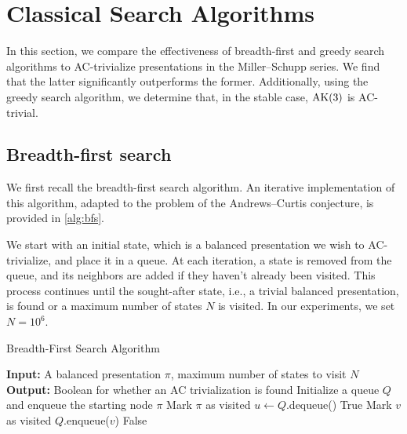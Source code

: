 
\section{Classical Search Algorithms}\label{sec:search}

In this section, we compare the effectiveness of breadth-first and greedy search algorithms to AC-trivialize presentations in the Miller--Schupp series.
We find that the latter significantly outperforms the former.
Additionally, using the greedy search algorithm, we determine that, in the stable case, $\text{AK}(3)$ is AC-trivial.

\subsection{Breadth-first search}

We first recall the breadth-first search algorithm.
An iterative implementation of this algorithm, adapted to the problem of the Andrews--Curtis conjecture, is provided in \autoref{alg:bfs}.

We start with an initial state, which is a balanced presentation we wish to AC-trivialize, and place it in a queue. At each iteration, a state is removed from the queue, and its neighbors are added if they haven't already been visited. This process continues until the sought-after state, i.e., a trivial balanced presentation, is found or a maximum number of states $N$ is visited. In our experiments, we set $N = 10^6$.

\begin{algorithm}
	\caption{Breadth-First Search Algorithm}\label{alg:bfs}
	\begin{algorithmic}[1] %
		\State \textbf{Input:} A balanced presentation $\pi$, maximum number of states to visit $N$
		\State \textbf{Output:} Boolean for whether an AC trivialization is found
		\State Initialize a queue $Q$ and enqueue the starting node $\pi$
		\State Mark $\pi$ as visited
		\State $u \gets Q$.dequeue() 
		\State \Return True 
		\EndIf
		\State Mark $v$ as visited
		\State $Q$.enqueue($v$) 
		\EndIf
		\EndFor
		\EndWhile
		\State \Return False 
	\end{algorithmic}
\end{algorithm}

